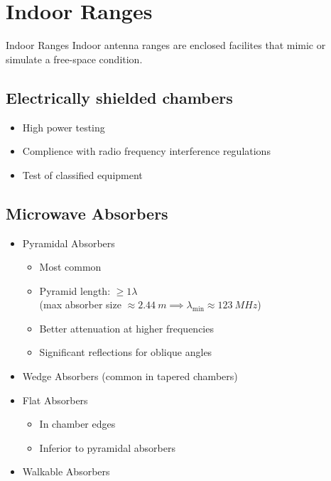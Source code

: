 \section{Indoor Ranges}
\begin{definition}{Indoor Ranges}
  Indoor antenna ranges are enclosed facilites that mimic or simulate a free-space condition.
\end{definition}

\subsection{Electrically shielded chambers}
\begin{itemize}
  \item High power testing
  \item Complience with radio frequency interference regulations
  \item Test of classified equipment
\end{itemize}

\subsection{Microwave Absorbers}
\begin{itemize}
        \item Pyramidal Absorbers
        \begin{itemize}
          \item Most common
          \item Pyramid length: $\geq 1 \lambda$\\
                (max absorber size $\approx \SI{2.44}{m} \implies \lambda_{\text{min}} \approx \SI{123}{MHz}$)
          \item Better attenuation at higher frequencies
            \item Significant reflections for oblique angles
        \end{itemize}
        \item Wedge Absorbers (common in tapered chambers)
  \item Flat Absorbers
        \begin{itemize}
          \item In chamber edges
          \item Inferior to pyramidal absorbers
        \end{itemize}
        \item Walkable Absorbers
\end{itemize}

